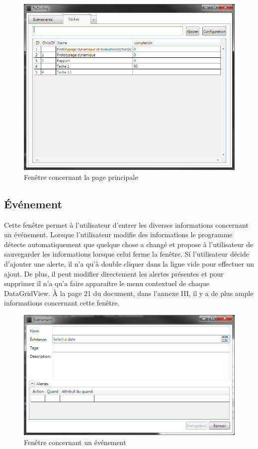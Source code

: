 \documentclass[letterpaper, oneside, 12pt, these, creativecommons]{thETS}
\begin{document}
\begin{figure}[H!]
	\centering
	\includegraphics[width=1\textwidth]{fenetre_main.png}
	\caption{Fenêtre concernant la page principale}
\end{figure}

\newpage

\subsection{Événement}

Cette fenêtre permet à l'utilisateur d'entrer les diverses informations concernant un événement. Lorsque l'utilisateur modifie des informations le programme détecte automatiquement que quelque chose a changé et propose à l'utilisateur de sauvegarder les informations lorsque celui ferme la fenêtre. Si l'utilisateur décide d'ajouter une alerte, il n'a qu'à double cliquer dans la ligne vide pour effectuer un ajout. De plus, il peut modifier directement les alertes présentes et pour supprimer il n'a qu'a faire apparaitre le menu contextuel de chaque DataGridView. À la page 21 du document, dans l'annexe III, il y a de plus ample informations concernant cette fenêtre.

\begin{figure}[H!]
	\centering
	\includegraphics[width=1\textwidth]{fenetre_evenement.png}
	\caption{Fenêtre concernant un événement}
\end{figure}
\end{document}
